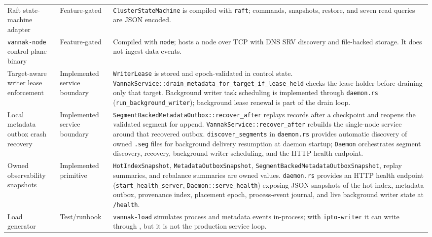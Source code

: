 \begin{longtable}{p{}p{}p{}}
Raft state-machine adapter & Feature-gated &
\texttt{ClusterStateMachine} is compiled with \texttt{raft}; commands,
snapshots, restore, and seven read queries are JSON encoded. \\

\texttt{vannak-node} control-plane binary & Feature-gated &
Compiled with \texttt{node}; hosts a \graft{} node over TCP with DNS SRV
discovery and file-backed \raft{} storage. It does not ingest data events. \\

Target-aware writer lease enforcement & Implemented service boundary &
\texttt{WriterLease} is stored and epoch-validated in control state.
\texttt{VannakService::drain\_metadata\_for\_target\_if\_lease\_held} checks the
lease holder before draining only that target. Background writer task scheduling
is implemented through \texttt{daemon.rs} (\texttt{run\_background\_writer});
background lease renewal is part of the drain loop. \\

Local metadata outbox crash recovery & Implemented service boundary &
\texttt{SegmentBackedMetadataOutbox::recover\_after} replays records after a
checkpoint and reopens the validated segment for append.
\texttt{VannakService::recover\_after} rebuilds the single-node service around
that recovered outbox.
\texttt{discover\_segments} in \texttt{daemon.rs} provides automatic discovery
of owned \texttt{.seg} files for background delivery resumption at daemon
startup; \texttt{Daemon} orchestrates segment discovery, recovery, background
writer scheduling, and the HTTP health endpoint. \\

Owned observability snapshots & Implemented primitive &
\texttt{HotIndexSnapshot}, \texttt{MetadataOutboxSnapshot},
\texttt{SegmentBackedMetadataOutboxSnapshot}, replay summaries, and rebalance
summaries are owned values.
\texttt{daemon.rs} provides an HTTP health endpoint (\texttt{start\_health\_server},
\texttt{Daemon::serve\_health}) exposing JSON snapshots of the hot index,
metadata outbox, provenance index, placement epoch, process-event journal, and
live background writer state at \texttt{/health}. \\

Load generator & Test/runbook &
\texttt{vannak-load} simulates process and metadata events in-process; with
\texttt{ipto-writer} it can write through \ipto{}, but it is not the production
service loop. \\


\end{longtable}
